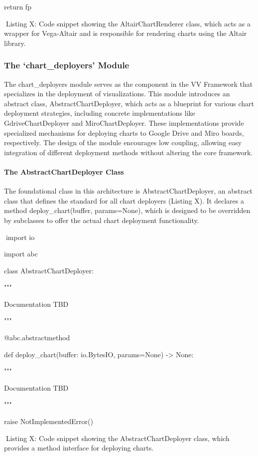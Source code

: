 \documentclass[
]{article}
\begin{document}
return fp

Listing X: Code snippet showing the AltairChartRenderer class, which
acts as a wrapper for Vega-Altair and is responsible for rendering
charts using the Altair library.

\subsubsection{The `chart\_deployers'
Module}\label{the-chart_deployers-module}

The chart\_deployers module serves as the component in the VV Framework
that specializes in the deployment of visualizations. This module
introduces an abstract class, AbstractChartDeployer, which acts as a
blueprint for various chart deployment strategies, including concrete
implementations like GdriveChartDeployer and MiroChartDeployer. These
implementations provide specialized mechanisms for deploying charts to
Google Drive and Miro boards, respectively. The design of the module
encourages low coupling, allowing easy integration of different
deployment methods without altering the core framework.

\paragraph{The AbstractChartDeployer
Class}\label{the-abstractchartdeployer-class}

The foundational class in this architecture is AbstractChartDeployer, an
abstract class that defines the standard for all chart deployers
(Listing X). It declares a method deploy\_chart(buffer, params=None),
which is designed to be overridden by subclasses to offer the actual
chart deployment functionality.

import io

import abc

class AbstractChartDeployer:

"""

Documentation TBD

"""

@abc.abstractmethod

def deploy\_chart(buffer: io.BytesIO, params=None) -\textgreater{} None:

"""

Documentation TBD

"""

raise NotImplementedError()

Listing X: Code snippet showing the AbstractChartDeployer class, which
provides a method interface for deploying charts.
\end{document}
